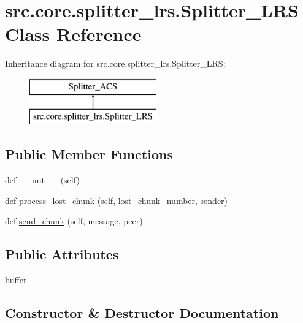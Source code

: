 \hypertarget{classsrc_1_1core_1_1splitter__lrs_1_1Splitter__LRS}{}\section{src.\+core.\+splitter\+\_\+lrs.\+Splitter\+\_\+\+L\+R\+S Class Reference}
\label{classsrc_1_1core_1_1splitter__lrs_1_1Splitter__LRS}
Inheritance diagram for src.\+core.\+splitter\+\_\+lrs.\+Splitter\+\_\+\+L\+R\+S\+:\begin{figure}[H]
\begin{center}
\leavevmode
\includegraphics[height=2.000000cm]{classsrc_1_1core_1_1splitter__lrs_1_1Splitter__LRS}
\end{center}
\end{figure}
\subsection*{Public Member Functions}
\begin{DoxyCompactItemize}
\item 
def \hyperlink{classsrc_1_1core_1_1splitter__lrs_1_1Splitter__LRS_a2af1b9374e44f463f69f61070a82b2bf}{\+\_\+\+\_\+init\+\_\+\+\_\+} (self)
\item 
def \hyperlink{classsrc_1_1core_1_1splitter__lrs_1_1Splitter__LRS_a4216d0f000f3484a13199b47a95c25fe}{process\+\_\+lost\+\_\+chunk} (self, lost\+\_\+chunk\+\_\+number, sender)
\item 
def \hyperlink{classsrc_1_1core_1_1splitter__lrs_1_1Splitter__LRS_aaa3ae5c39084168c50d8943a1b37b338}{send\+\_\+chunk} (self, message, peer)
\end{DoxyCompactItemize}
\subsection*{Public Attributes}
\begin{DoxyCompactItemize}
\item 
\hyperlink{classsrc_1_1core_1_1splitter__lrs_1_1Splitter__LRS_aa593047d817d9b5d67b0814fd400d78e}{buffer}
\end{DoxyCompactItemize}


\subsection{Constructor \& Destructor Documentation}
\hypertarget{classsrc_1_1core_1_1splitter__lrs_1_1Splitter__LRS_a2af1b9374e44f463f69f61070a82b2bf}{}
